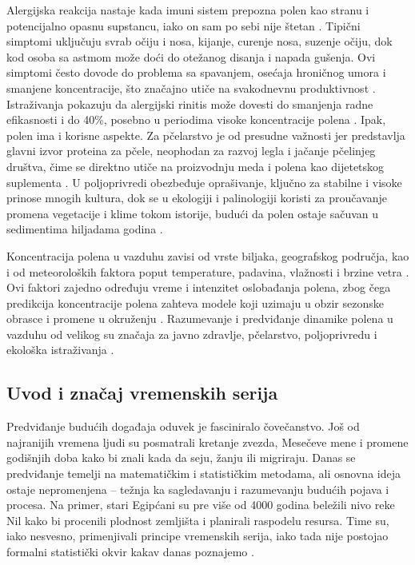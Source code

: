 \documentclass[12pt]{article}
\begin{document}
Alergijska reakcija nastaje kada imuni sistem prepozna polen kao stranu i potencijalno opasnu supstancu, iako on sam po sebi nije štetan \cite{bionette2023}. Tipični simptomi uključuju svrab očiju i nosa, kijanje, curenje nosa, suzenje očiju, dok kod osoba sa astmom može doći do otežanog disanja i napada gušenja. Ovi simptomi često dovode do problema sa spavanjem, osećaja hroničnog umora i smanjene koncentracije, što značajno utiče na svakodnevnu produktivnost \cite{minic2020}. Istraživanja pokazuju da alergijski rinitis može dovesti do smanjenja radne efikasnosti i do 40\%, posebno u periodima visoke koncentracije polena \cite{sofia2023}.
Ipak, polen ima i korisne aspekte. Za pčelarstvo je od presudne važnosti jer predstavlja glavni izvor proteina za pčele, neophodan za razvoj legla i jačanje pčelinjeg društva, čime se direktno utiče na proizvodnju meda i polena kao dijetetskog suplementa \cite{pollenBio2021}. U poljoprivredi obezbeđuje oprašivanje, ključno za stabilne i visoke prinose mnogih kultura, dok se u ekologiji i palinologiji koristi za proučavanje promena vegetacije i klime tokom istorije, budući da polen ostaje sačuvan u sedimentima hiljadama godina \cite{piotrowska2012}.

Koncentracija polena u vazduhu zavisi od vrste biljaka, geografskog područja, kao i od meteoroloških faktora poput temperature, padavina, vlažnosti i brzine vetra \cite{chico2025}. Ovi faktori zajedno određuju vreme i intenzitet oslobađanja polena, zbog čega predikcija koncentracije polena zahteva modele koji uzimaju u obzir sezonske obrasce i promene u okruženju \cite{sofia2023}. Razumevanje i predviđanje dinamike polena u vazduhu od velikog su značaja za javno zdravlje, pčelarstvo, poljoprivredu i ekološka istraživanja \cite{minic2020}.

\subsection{Uvod i značaj vremenskih serija}
Predviđanje budućih događaja oduvek je fasciniralo čovečanstvo. Još od najranijih vremena ljudi su posmatrali kretanje zvezda, Mesečeve mene i promene godišnjih doba kako bi znali kada da seju, žanju ili migriraju. Danas se predviđanje temelji na matematičkim i statističkim metodama, ali osnovna ideja ostaje nepromenjena – težnja ka sagledavanju i razumevanju budućih pojava i procesa. Na primer, stari Egipćani su pre više od 4000 godina beležili nivo reke Nil kako bi procenili plodnost zemljišta i planirali raspodelu resursa. Time su, iako nesvesno, primenjivali principe vremenskih serija, iako tada nije postojao formalni statistički okvir kakav danas poznajemo \cite{metnil2025}.
\end{document}
